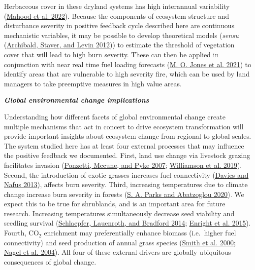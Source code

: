 \documentclass[
  12pt,
]{article}
\begin{document}
Herbaceous cover in these dryland systems has high interannual
variability (\protect\hyperlink{ref-Mahood2021}{Mahood et al. 2022}).
Because the components of ecosystem structure and disturbance severity
in positive feedback cycle described here are continuous mechanistic
variables, it may be possible to develop theoretical models
(\emph{sensu} (\protect\hyperlink{ref-Archibald2012}{Archibald, Staver,
and Levin 2012})) to estimate the threshold of vegetation cover that
will lead to high burn severity. These can then be applied in
conjunction with near real time fuel loading forecasts
(\protect\hyperlink{ref-Jones2021}{M. O. Jones et al. 2021}) to identify
areas that are vulnerable to high severity fire, which can be used by
land managers to take preemptive measures in high value areas.

\textbf{\emph{Global environmental change implications}}

Understanding how different facets of global environmental change create
multiple mechanisms that act in concert to drive ecosystem
transformation will provide important insights about ecosystem change
from regional to global scales. The system studied here has at least
four external processes that may influence the positive feedback we
documented. First, land use change via livestock grazing facilitates
invasion (\protect\hyperlink{ref-Ponzetti2007}{Ponzetti, Mccune, and
Pyke 2007}; \protect\hyperlink{ref-Williamson2019}{Williamson et al.
2019}). Second, the introduction of exotic grasses increases fuel
connectivity (\protect\hyperlink{ref-Davies2013}{Davies and Nafus
2013}), affects burn severity. Third, increasing temperatures due to
climate change increase burn severity in forests
(\protect\hyperlink{ref-Parks2020}{S. A. Parks and Abatzoglou 2020}). We
expect this to be true for shrublands, and is an important area for
future research. Increasing temperatures simultaneously decrease seed
viability and seedling survival
(\protect\hyperlink{ref-Schlaepfer2014}{Schlaepfer, Lauenroth, and
Bradford 2014}; \protect\hyperlink{ref-Enright2015}{Enright et al.
2015}). Fourth, CO\(_2\) enrichment may preferentially enhance biomass
(i.e.~higher fuel connectivity) and seed production of annual grass
species (\protect\hyperlink{ref-Smith2000}{Smith et al. 2000};
\protect\hyperlink{ref-Nagel2004}{Nagel et al. 2004}). All four of these
external drivers are globally ubiquitous consequences of global change.
\end{document}
